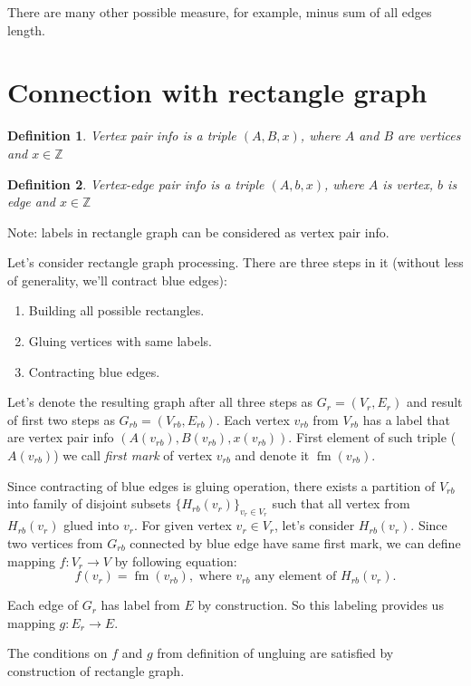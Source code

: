 \documentclass[12pt,a4paper,oneside]{article}
\newtheorem{definition}{Definition}
\begin{document}
There are many other possible measure, for example, minus sum of all edges length.

\section{Connection with rectangle graph}

\begin{definition}
  \emph{Vertex pair info} is a triple $(A, B, x)$, where $A$ and $B$ are vertices and $x \in \mathbb{Z}$ 
\end{definition}
\begin{definition}
  \emph{Vertex-edge pair info} is a triple $(A, b, x)$, where $A$ is vertex, $b$ is edge and $x \in \mathbb{Z}$ 
\end{definition}
Note: labels in rectangle graph can be considered as vertex pair info.

Let's consider rectangle graph processing. 
There are three steps in it (without less of generality, we'll contract blue edges):
\begin{enumerate}
\item Building all possible rectangles.
\item Gluing vertices with same labels.
\item Contracting blue edges.
\end{enumerate}
Let's denote the resulting graph after all three steps as $G_r = (V_r,E_r)$ and result of first two steps as $G_{rb} = (V_{rb}, E_{rb})$. Each vertex $v_{rb}$ from $V_{rb}$ has a label that are vertex pair info $(A(v_{rb}), B(v_{rb}), x(v_{rb}))$. First element of such triple ($A(v_{rb})$) we call \emph{first mark} of vertex $v_{rb}$ and denote it $\mathop{fm}(v_{rb})$. 

Since contracting of blue edges is gluing operation, there exists a partition of $V_{rb}$ into family of disjoint subsets $\{H_{rb}(v_r)\}_{v_r\in V_r}$ such that all vertex from $H_{rb}(v_r)$ glued into $v_r$. 
For given vertex $v_r \in V_r$, let's consider $H_{rb}(v_r)$. Since two vertices from $G_{rb}$ connected by blue edge have same first mark, we can define mapping $f: V_r\rightarrow V$ by following equation:
$$f(v_r)=\mathop{fm}(v_{rb}), \text{ where }v_{rb}\text{ any element of } H_{rb}(v_r).$$

Each edge of $G_{r}$ has label from $E$ by construction. So this labeling provides us mapping $g:E_{r}\rightarrow E$. 

The conditions on $f$ and $g$ from definition of ungluing are satisfied by construction of rectangle graph.
\end{document}
